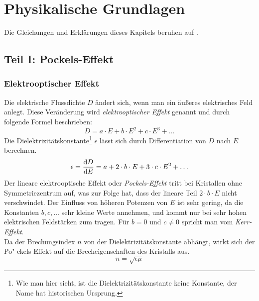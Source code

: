 \section{Physikalische Grundlagen}
Die Gleichungen und Erklärungen dieses Kapitels beruhen auf \cite{herrmann}.
\subsection{Teil I: Pockels-Effekt}

\subsubsection{Elektrooptischer Effekt}
Die elektrische Flussdichte $D$ ändert sich, wenn man ein äußeres elektrisches Feld anlegt. Diese Veränderung wird 
\emph{elektrooptischer Effekt} genannt und durch folgende Formel beschrieben:
\begin{equation}
\label{eq:eoeff}
  D = a \cdot E + b \cdot E^2 + c \cdot E^3 + \ldots
\end{equation}
Die Dielektrizitätskonstante\footnote{Wie man hier sieht, ist die Dielektrizitätskonstante keine Konstante, der Name hat historischen Ursprung.} 
$\epsilon$ lässt sich durch Differentiation von $D$ nach $E$ berechnen.
\begin{equation}
\label{eq:dielconst}
  \epsilon = \frac{\mathrm{d} D}{\mathrm{d} E} = a + 2 \cdot b \cdot E + 3 \cdot c \cdot E^2 + \ldots
\end{equation}
Der lineare elektrooptische Effekt oder \emph{Pockels-Effekt} tritt bei Kristallen ohne Symmetriezentrum auf, was zur Folge hat, dass 
der lineare Teil $2 \cdot b \cdot E$ nicht verschwindet. Der Einfluss von höheren Potenzen von $E$ ist sehr gering, da die Konstanten 
$b, c, \ldots$ sehr kleine Werte annehmen, und kommt nur bei sehr hohen elektrischen Feldstärken zum tragen. 
Für $b = 0$ und $c \neq 0$ spricht man vom \emph{Kerr-Effekt}. \\
Da der Brechungsindex $n$ von der Dielektrizitätskonstante abhängt, wirkt sich der Po"-ckels-Effekt auf die Brecheigenschaften des Kristalls aus.
\begin{equation}
  n = \sqrt{\epsilon \mu}
\end{equation}

